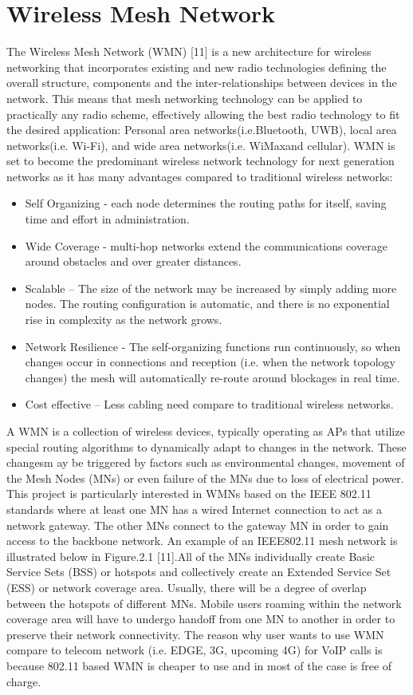 \documentclass[12pt,a4paper]{report}
\begin{document}
\section{Wireless Mesh Network}
The Wireless Mesh Network (WMN) [11] is a new architecture for wireless networking that incorporates existing and new radio technologies defining the overall structure, components and the inter-relationships between devices in the network. This means that mesh networking technology can be applied to practically any radio scheme, effectively allowing the best radio technology to fit the desired application: Personal area networks(i.e.Bluetooth, UWB), local area networks(i.e. Wi-Fi), and wide area networks(i.e. WiMaxand cellular). WMN is set to become the predominant wireless network technology for next generation networks as it has many advantages compared to traditional wireless networks:
 \begin{itemize}
 \item 
 Self Organizing - each node determines the routing paths for itself, saving time and effort in administration.
\item 
 Wide Coverage - multi-hop networks extend the communications coverage around obstacles and over greater distances.
\item 
 Scalable – The size of the network may be increased by simply adding more nodes.
The routing configuration is automatic, and there is no exponential rise in complexity as the network grows.
\item 
 Network Resilience - The self-organizing functions run continuously, so when changes occur in connections and reception (i.e. when the network topology changes) the mesh will automatically re-route around blockages in real time.
\item
Cost effective – Less cabling need compare to traditional wireless networks.
\end{itemize}
A WMN is a collection of wireless devices, typically operating as APs that utilize special routing algorithms to dynamically adapt to changes in the network. These changesm ay be triggered by factors such as environmental changes, movement of the Mesh Nodes (MNs) or even failure of the MNs due to loss of electrical power. This project is particularly interested in WMNs based on the IEEE 802.11 standards where at least one MN has a wired Internet connection to act as a network gateway. The other MNs connect to the gateway MN in order to gain access to the backbone network. An example of an IEEE802.11 mesh network is illustrated below in Figure.2.1 [11].All of the MNs individually create Basic Service Sets (BSS) or hotspots and collectively create an Extended Service Set (ESS) or network coverage area. Usually, there will be a degree of overlap between the hotspots of different MNs. Mobile users roaming within the network coverage area will have to undergo handoff from one MN to another in order to preserve their network connectivity. The reason why user wants to use WMN compare to telecom network (i.e. EDGE, 3G, upcoming 4G) for VoIP calls is because 802.11 based WMN is cheaper to use and in most of the case is free of charge.
\end{document}
